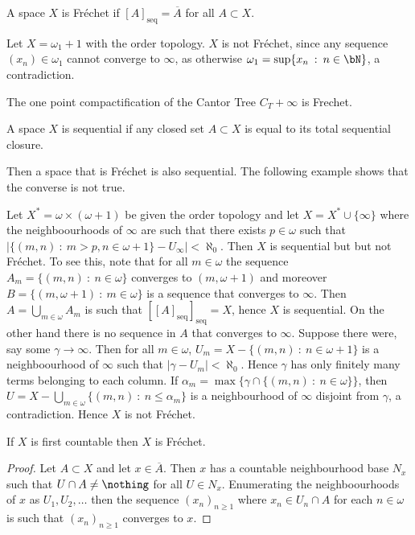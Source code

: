 \documentclass{article}
\newcommand{\seqcl}[1]{{[#1]_{\text{seq}}}}
\begin{document}
\begin{defn}
    A space \(X\) is Fréchet if \(\seqcl{A} = \overline{A}\) for all \(A \subset X\).
\end{defn}
\begin{exam}
    Let \(X = \omega_1 + 1\) with the order topology. \(X\) is not Fréchet, since any sequence \((x_n) \in \omega_1\) cannot converge to \(\infty\), as otherwise \(\omega_1 = \sup\{x_n \: : \: n \in \bN\}\), a contradiction.
\end{exam}
\begin{exam}
    The one point compactification of the Cantor Tree \(C_T + \infty\) is Frechet.
\end{exam}
\begin{defn}
    A space \(X\) is sequential if any closed set \(A \subset X\) is equal to its total sequential closure.
\end{defn}
Then a space that is Fréchet is also sequential. The following example shows that the converse is not true.

 
\begin{exam}
    Let \(X^{\ast} = \omega \times (\omega + 1)\) be given the order topology and let \(X =  X^{\ast} \cup \{\infty\}\) where the neighboourhoods  of \(\infty\) are such that there exists \(p \in \omega\) such that \(|\{(m, n) \: : \: m > p, n \in \omega + 1\} - U_{\infty}| < \aleph_0\). Then \(X\) is sequential but but not Fréchet. To see this, note that for all \(m \in \omega\) the sequence \(A_m = \{(m, n) \: : \: n \in \omega\}\) converges to \((m, \omega + 1)\) and moreover \(B = \{(m, \omega + 1) \: : \: m \in \omega\}\) is a sequence that converges to \(\infty\). Then \(A = \bigcup_{m \in \omega} A_m\) is such that \(\seqcl{\seqcl{A}} = X\), hence \(X\) is sequential. On the other hand there is no sequence in \(A\) that converges to \(\infty\). Suppose there were, say some \(\gamma \to \infty\). Then for all \(m \in \omega\), \(U_m = X - \{(m, n)\: : \: n \in \omega + 1\}\) is a neighboourhood of \(\infty\) such that \(|\gamma - U_m| < \aleph_0\). Hence \(\gamma\) has only finitely many terms belonging to each column. If \(\alpha_m = \max\{\gamma \cap \{(m, n) \: : \: n \in \omega\}\}\), then \(U = X - \bigcup_{m \in \omega} \{(m ,n )\: : \:  n \leq \alpha_m\}\) is a neighbourhood of \(\infty\) disjoint from \(\gamma\), a contradiction. Hence \(X\) is not Fréchet. 
\end{exam} 
\begin{prop}
    If \(X\) is first countable then \(X\) is Fréchet.
\end{prop}
\begin{proof}
    Let \(A \subset X\) and let \(x \in \overline{A}\). Then \(x\) has a countable neighbourhood base \(N_x\) such that \(U \cap A \neq \nothing\) for all \(U \in N_x\). Enumerating the neighboourhoods of \(x\) as \(U_1, U_2, \dots\) then the sequence \((x_n)_{n \ge 1}\) where \(x_n \in U_n \cap A\) for each \(n \in \omega\) is such that \((x_n)_{n \ge 1}\) converges to \(x\).
\end{proof}
\end{document}
